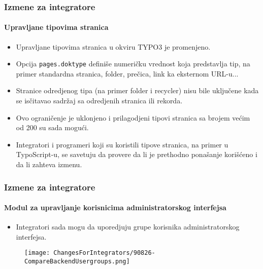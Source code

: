 \begin{frame}[fragile]
	\frametitle{Izmene za integratore}
	\framesubtitle{Upravljane tipovima stranica}

	\begin{itemize}
		\item Upravljane tipovima stranica u okviru TYPO3 je promenjeno.
		\item Opcija \texttt{pages.doktype} definiše numeričku vrednost koja predstavlja tip,
			na primer standardna stranica, folder, prečica, link ka eksternom URL-u...
		\item Stranice odredjenog tipa (na primer folder i recycler) nisu bile uključene kada
			se isčitavao sadržaj sa odredjenih stranica ili rekorda.
		\item Ovo ograničenje je uklonjeno i prilagodjeni tipovi stranica sa brojem većim od 200
			su sada mogući.
		\item Integratori i programeri koji su koristili tipove stranica, na primer u TypoScript-u,
			se savetuju da provere da li je prethodno ponašanje korišćeno i da li zahteva izmenu.
	\end{itemize}

\end{frame}


\begin{frame}[fragile]
	\frametitle{Izmene za integratore}
	\framesubtitle{Modul za upravljanje korisnicima administratorskog interfejsa}

	\begin{itemize}
		\item Integratori sada mogu da uporedjuju grupe korisnika administratorskog interfejsa.
	\end{itemize}

	\begin{figure}
		\texttt{[image: ChangesForIntegrators/90826-CompareBackendUsergroups.png]}
	\end{figure}

\end{frame}


